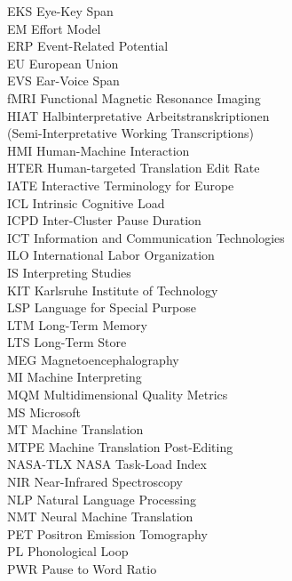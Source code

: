 \begin{tabbing}
{EKS}  \>  Eye-Key Span\\
{EM}  \>  Effort Model\\
{ERP}  \>  Event-Related Potential\\
{EU}  \>  European Union\\
{EVS}  \>  Ear-Voice Span\\
{fMRI}  \>  Functional Magnetic Resonance Imaging\\
{HIAT}  \>  Halbinterpretative Arbeitstranskriptionen \\ \> (Semi-Interpretative Working Transcriptions)\\
{HMI}  \>  Human-Machine Interaction\\
{HTER}  \>  Human-targeted Translation Edit Rate\\
{IATE}  \>  Interactive Terminology for Europe\\
{ICL}  \>  Intrinsic Cognitive Load\\
{ICPD}  \>  Inter-Cluster Pause Duration\\
{ICT}  \>  Information and Communication Technologies\\
{ILO}  \>  International Labor Organization\\
{IS}  \>  Interpreting Studies\\
{KIT}  \>  Karlsruhe Institute of Technology\\
{LSP}  \>  Language for Special Purpose\\
{LTM}  \>  Long-Term Memory\\
{LTS}  \>  Long-Term Store\\
{MEG}  \>  Magnetoencephalography\\
{MI}  \>  Machine Interpreting\\
{MQM}  \>  Multidimensional Quality Metrics\\
{MS}  \>  Microsoft\\
{MT}  \>  Machine Translation\\
{MTPE}  \>  Machine Translation Post-Editing\\
{NASA-TLX}  \>  NASA Task-Load Index\\
{NIR}  \>  Near-Infrared Spectroscopy\\
{NLP}  \>  Natural Language Processing\\
{NMT}  \>  Neural Machine Translation\\
{PET}  \>  Positron Emission Tomography\\
{PL}  \>  Phonological Loop\\
{PWR}  \>  Pause to Word Ratio\\

\end{tabbing}
